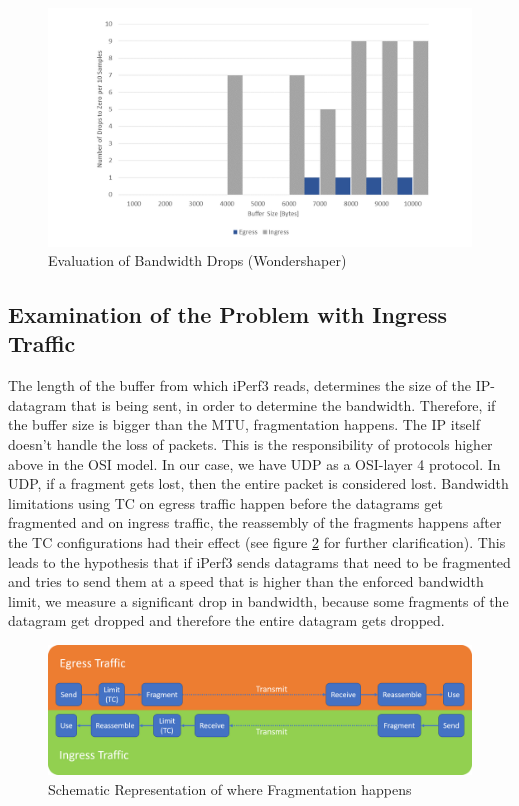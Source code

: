 \begin{figure}[h]
	\centering
	\includegraphics[width=\textwidth]{img/Evaluation-Zeros-Wondershaper.png}
	\caption{Evaluation of Bandwidth Drops (Wondershaper)}
	\label{Evaluation of the Bandwidth Drops (Wondershaper)}
\end{figure}

\newpage
\subsection{Examination of the Problem with Ingress Traffic}

The length of the buffer from which iPerf3 reads, determines the size of the \acs{IP}-datagram that is being sent, in order to determine the bandwidth. Therefore, if the buffer size is bigger than the \acs{MTU}, fragmentation happens. The \acl{IP} itself doesn't handle the loss of packets. This is the responsibility of protocols higher above in the \acs{OSI} model. In our case, we have \acs{UDP} as a  \acs{OSI}-layer 4 protocol. In \acs{UDP}, if a fragment gets lost, then the entire packet is considered lost. Bandwidth limitations using \acs{TC} on egress traffic happen before the datagrams get fragmented and on ingress traffic, the reassembly of the fragments happens after the \acs{TC} configurations had their effect (see figure \ref{Schematic Representation of where Fragmentation happens} for further clarification). This leads to the hypothesis that if iPerf3 sends datagrams that need to be fragmented and tries to send them at a speed that is higher than the enforced bandwidth limit, we measure a significant drop in bandwidth, because some fragments of the datagram get dropped and therefore the entire datagram gets dropped.

\begin{figure}[h]
	\centering
	\includegraphics[width=\textwidth]{img/Fragmentation.png}
	\caption{Schematic Representation of where Fragmentation happens}
	\label{Schematic Representation of where Fragmentation happens}
\end{figure}

